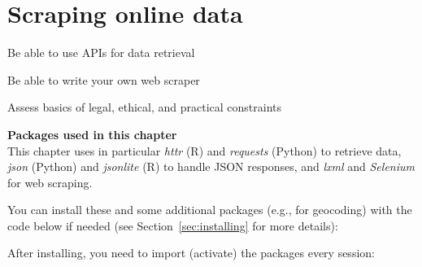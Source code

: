 \chapter{Scraping online data}
\label{chap:scraping}

\begin{abstract}{Abstract}
In this chapter, you will learn how to retrieve your data from online sources. We first discuss the use of Application Programming Interfaces, more commonly known as APIs, which allow you to retrieve data from social media platforms, government websites, or other forms of open data, in a machine-readable format. We then discuss how to do web scraping in a narrower sense to retrieve data from websites that do not offer an API. We also discuss how to deal with authentication mechanisms, cookies, and the like, as well as ethical, legal, and practical considerations.
\end{abstract}



\begin{objectives}
\item Be able to use APIs for data retrieval
\item Be able to write your own web scraper
\item Assess basics of legal, ethical, and practical constraints
\end{objectives}


\newpage
\begin{feature}
  \textbf{Packages used in this chapter}\\
  This chapter uses in particular \emph{httr} (R) and \emph{requests} (Python) to retrieve data, \emph{json} (Python) and \emph{jsonlite} (R) to handle JSON responses, and \emph{lxml} and \emph{Selenium} for web scraping.

You can install these and some additional packages (e.g., for geocoding) with the code below if needed  (see Section~\ref{sec:installing} for more details):


\noindent After installing, you need to import (activate) the packages every session:

\end{feature}




